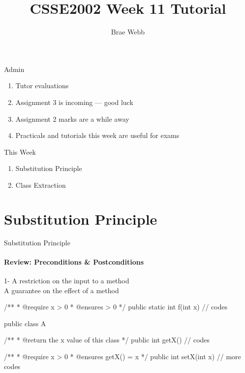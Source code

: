 \documentclass[week11]{csse2002}
\author{Brae Webb}
\title{CSSE2002 Week 11 Tutorial}
\begin{document}
\begin{frame}
\maketitle
\end{frame}

\begin{topic}{Admin}
\begin{enumerate}
	\item Tutor evaluations
    \item Assignment 3 is incoming --- good luck
    \item Assignment 2 marks are a while away
    \item Practicals and tutorials this week are useful for exams
\end{enumerate}
\end{topic}

\begin{topic}{This Week}
\begin{enumerate}
    \item Substitution Principle
    \item Class Extraction
\end{enumerate}
\end{topic}

\section{Substitution Principle}

\begin{topic}{Substitution Principle}
\framesubtitle{Review: Preconditions \& Postconditions}
\begin{subtopic}{1-}
A  restriction on the input to a method\\
A  guarantee on the effect of a method
\end{subtopic}

\begin{subtopic}{2}
\begin{java}
/**
 * @require x > 0
 * @ensures \result > 0
 */
public static int f(int x) {
	// codes
}
\end{java}
\end{subtopic}

\begin{subtopic}{3}
\begin{java}
public class A {
	/**
	 * @return the x value of this class
	 */
	public int getX() {
		// codes
	}

	/**
	 * @require x > 0
	 * @ensures getX() = x
	 */
	public int setX(int x) {
		// more codes
	}
}
\end{java}
\end{subtopic}
\end{topic}
\end{document}
